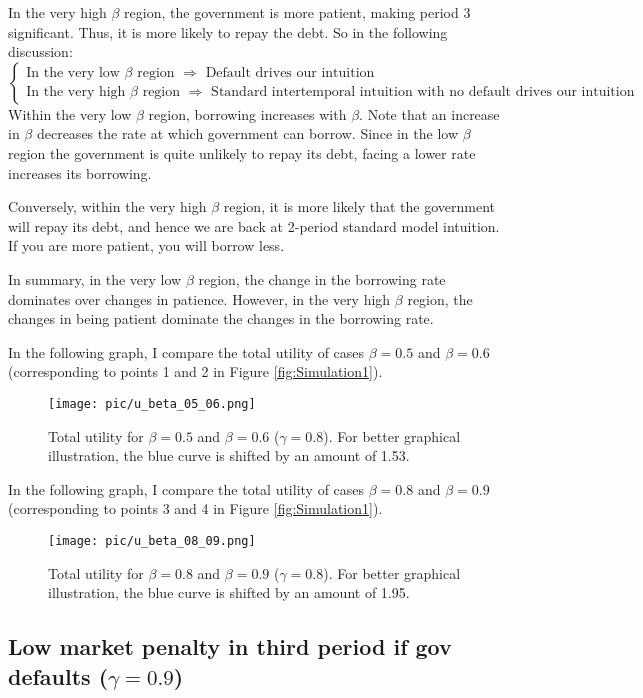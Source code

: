 \documentclass{article}
\begin{document}
In the very high $\beta$ region, the government is more patient, making period 3 significant. Thus, it is more likely to repay the debt. So in the following discussion:
$$
\begin{cases}
\text{In the very low $\beta$ region $\Rightarrow$ Default drives our intuition} \\
\text{In the very high $\beta$ region $\Rightarrow$ Standard intertemporal intuition with no default drives our intuition}
\end{cases}
$$
Within the very low $\beta$ region, borrowing increases with $\beta$. Note that an increase in $\beta$ decreases the rate at which government can borrow. Since in the low $\beta$ region the government is quite unlikely to repay its debt, facing a lower rate increases its borrowing.


Conversely,  within the very high $\beta$ region, it is more likely that the government will repay its debt, and hence we are back at 2-period standard model intuition. If you are more patient, you will borrow less. 

In summary, in the very low $\beta$ region, the change in the borrowing rate dominates over changes in patience. However, in the very high $\beta$ region, the changes in being patient dominate the changes in the borrowing rate.

In the following graph, I compare the total utility of cases $\beta =0.5$ and $\beta =0.6$ (corresponding to points 1 and 2 in Figure \ref{fig:Simulation1}).

\begin{figure}[H]
\centering
{\texttt{[image: pic/u\_beta\_05\_06.png]}}
\caption{Total utility for $\beta = 0.5$ and $\beta = 0.6$ ($\gamma =0.8$). For better graphical illustration, the blue curve is shifted by an amount of 1.53.}
\end{figure}

In the following graph, I compare the total utility of cases $\beta =0.8$ and $\beta =0.9$ (corresponding to points 3 and 4 in Figure \ref{fig:Simulation1}).

\begin{figure}[H]
\centering
{\texttt{[image: pic/u\_beta\_08\_09.png]}}
\caption{Total utility for $\beta = 0.8$ and $\beta = 0.9$ ($\gamma =0.8$). For better graphical illustration, the blue curve is shifted by an amount of 1.95.}
\end{figure}


\subsection{Low market penalty in third period if gov defaults ($\gamma = 0.9$)}
\end{document}
